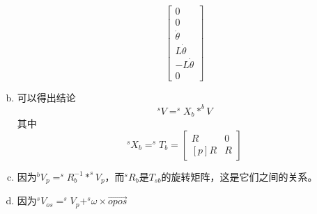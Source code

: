 \begin{enumerate}[(a)]
\[\begin{bmatrix}
    0 \\ 0 \\ \dot{\theta} \\ L\dot{\theta} \\ -L\dot{\theta} \\ 0
    \end{bmatrix}\]
    \item 
    可以得出结论 \[^sV= ^sX_b * ^bV \]
    其中
    \[^sX_b = ^sT_b = \begin{bmatrix}
        R & 0 \\ [p]R & R
    \end{bmatrix} \]
    \item 
    因为\(^bV_p = ^sR_b^{-1} * ^sV_p\)，而\(^sR_b\text{是}T_{sb}\)的旋转矩阵，这是它们之间的关系。
    \item 
    因为\(^sV_{os} = ^sV_p + ^s\omega \times \overrightarrow{opos}\)
\end{enumerate}